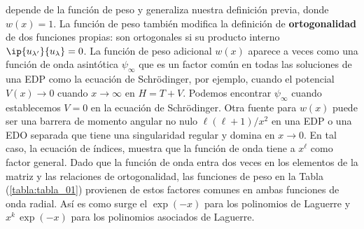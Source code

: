 depende de la función de peso y generaliza nuestra definición previa, donde $w(x) = 1$. La función de peso también modifica la definición de \textbf{ortogonalidad} de dos funciones propias: son ortogonales si su producto interno $\ip{u_{\lambda^{\prime}}}{u_{\lambda}} = 0$. La función de peso adicional $w(x)$ aparece a veces como una función de onda asintótica $\psi_{\infty}$ que es un factor común en todas las soluciones de una EDP como la ecuación de Schrödinger, por ejemplo, cuando el potencial $V(x) \to 0$ cuando $x \to \infty$ en $H = T + V$. Podemos encontrar $\psi_{\infty}$ cuando establecemos $V = 0$ en la ecuación de Schrödinger. Otra fuente para $w(x)$ puede ser una barrera de momento angular no nulo $\ell (\ell +1)/x^{2}$ en una EDP o una EDO separada que tiene una singularidad regular y domina en $x \to 0$. En tal caso, la ecuación de índices, muestra que la función de onda tiene a $x^{\ell}$ como factor general. Dado que la función de onda entra dos veces en los elementos de la matriz y las relaciones de ortogonalidad, las funciones de peso en la Tabla (\ref{tabla:tabla_01}) provienen de estos factores comunes en ambas funciones de onda radial. Así es como surge el $\exp(-x)$ para los polinomios de Laguerre y $x^{k} \, \exp(-x)$ para los polinomios asociados de Laguerre.
